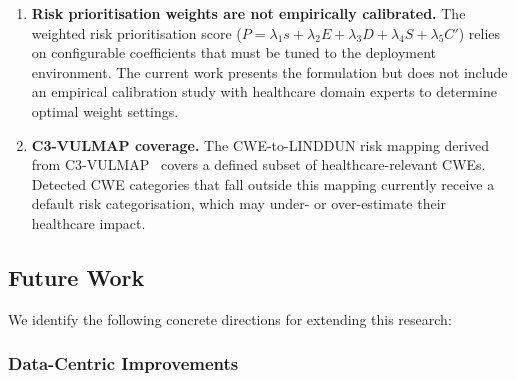 \documentclass[conference]{IEEEtran}
\begin{document}
\begin{enumerate}
    \item \textbf{Risk prioritisation weights are not empirically
          calibrated.}
          The weighted risk prioritisation score
          ($P = \lambda_1 s + \lambda_2 E + \lambda_3 D + \lambda_4 S
          + \lambda_5 C'$) relies on configurable coefficients that must
          be tuned to the deployment environment.  The current work
          presents the formulation but does not include an empirical
          calibration study with healthcare domain experts to determine
          optimal weight settings.

    \item \textbf{C3-VULMAP coverage.}
          The CWE-to-LINDDUN risk mapping derived from
          C3-VULMAP~\cite{ameh2025} covers a defined subset of
          healthcare-relevant CWEs.  Detected CWE categories that fall
          outside this mapping currently receive a default risk
          categorisation, which may under- or over-estimate their
          healthcare impact.
\end{enumerate}

\subsection{Future Work}
\label{sec:future_work}

We identify the following concrete directions for extending this research:

\subsubsection{Data-Centric Improvements}
\end{document}
